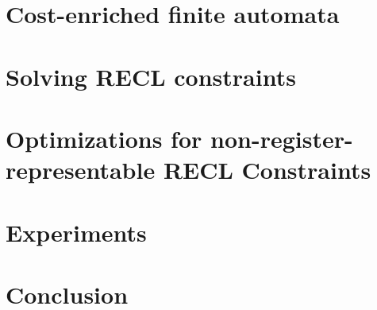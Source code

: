\documentclass[preprint,12pt]{elsarticle}
\begin{document}
\section{Cost-enriched finite automata} \label{sec:automaton}


\section{Solving RECL constraints} \label{sec:algorithm}


\section{Optimizations for non-register-representable RECL Constraints} \label{sec:heuristic}


\section{Experiments} \label{sec:implementation}


\section{Conclusion} \label{sec:conclu}


\newpage




%
\end{document}
